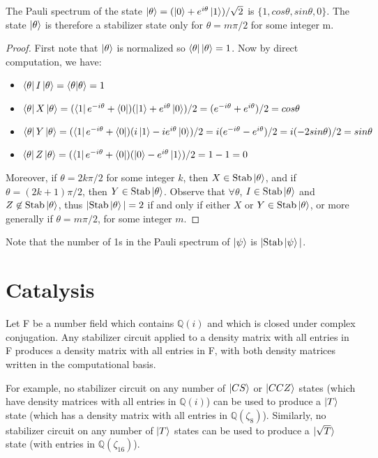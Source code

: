\documentclass[12pt]{dalthesis}
\begin{document}
\begin{proposition}
The Pauli spectrum of the state $\ket{\theta} = (\ket{0} + e^{i\theta}\ket{1})/\sqrt{2}$ is $\{1, cos\theta, sin\theta, 0\}$. The state $\ket{\theta}$ is therefore a stabilizer state only for $\theta = m \pi/2$ for some integer m.
\end{proposition}
\begin{proof}
First note that $\ket{\theta}$ is normalized so $\bra{\theta}\ket{\theta} = 1$. Now by direct computation, we have:
\begin{itemize}
\item $\bra{\theta}I\ket{\theta} = \braket{\theta|\theta} = 1$
\item $\bra{\theta}X\ket{\theta} = (\bra{1}e^{-i\theta} + \bra{0})(\ket{1} + e^{i\theta}\ket{0})/2 = (e^{-i\theta} + e^{i\theta})/2 = cos\theta$
\item $\bra{\theta}Y\ket{\theta} = (\bra{1}e^{-i\theta} + \bra{0})(i\ket{1} - ie^{i\theta}\ket{0})/2 = i(e^{-i\theta} - e^{i\theta})/2 = i(-2sin\theta)/2 = sin\theta$
\item $\bra{\theta}Z\ket{\theta} = (\bra{1}e^{-i\theta} + \bra{0})(\ket{0} - e^{i\theta}\ket{1})/2 = 1 - 1 = 0$
\end{itemize} 
Moreover, if $\theta = 2k\pi /2$ for some integer $k$, then $X \in \text{Stab}\ket{\theta}$, and if $\theta = (2k+1)\pi /2$, then $Y \in \text{Stab}\ket{\theta}$. Observe that $\forall \theta$, $I \in \text{Stab}\ket{\theta}$ and $Z \not\in \text{Stab}\ket{\theta}$, thus $|\text{Stab}\ket{\theta}| = 2$ if and only if either $X$ or $Y \in \text{Stab}\ket{\theta}$, or more generally if $\theta = m \pi /2$, for some integer $m$.
\end{proof}
Note that the number of 1s in the Pauli spectrum of $\ket{\psi}$ is $|\text{Stab}\ket{\psi}|$.

\section{Catalysis}

\begin{theorem}
Let F be a number field which contains $\mathbb{Q}(i)$ and which is closed under complex conjugation. Any stabilizer circuit applied to a density matrix with all entries in F produces a density matrix with all entries in F, with both density matrices written in the computational basis.
\end{theorem}

For example, no stabilizer circuit on any number of $\ket{CS}$ or $\ket{CCZ}$ states (which have density matrices with all entries in $\mathbb{Q}(i)$) can be used to produce a $\ket{T}$ state (which has a density matrix with all entries in $\mathbb{Q}(\zeta_8)$). Similarly, no stabilizer circuit on any number of $\ket{T}$ states can be used to produce a $\ket{\sqrt{T}}$ state (with entries in $\mathbb{Q}(\zeta_{16})$).
 
\end{document}
